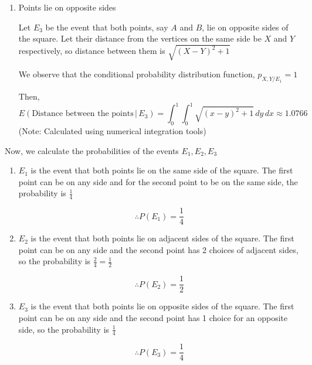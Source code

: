 \documentclass[12pt, oneside]{article}
\begin{document}
\begin{enumerate}
{\begin{enumerate}
        \item {
            Points lie on opposite sides

            Let \(E_3\) be the event that both points, say \(A\) and \(B\), lie on
            opposite sides of the square. Let their distance from the vertices on the
            same side be \(X\) and \(Y\) respectively, so distance between them is
            \(\sqrt{(X - Y)^2 + 1}\)

            We observe that the conditional probability distribution function,
            \(p_{X, Y / E_1} = 1\) 

            Then, \[
                E(\text{Distance between the points} \,|\, E_3) = \int_{0}^{1} \int_{0}^{1}
                   \sqrt{(x-y)^2 + 1} \,dy \,dx \approx 1.0766
            \]
            \hfill (Note: Calculated using numerical integration tools)
        }
    \end{enumerate}

    Now, we calculate the probabilities of the events \(E_1, E_2, E_3\)

    \begin{enumerate}
        \item {
            \(E_1\) is the event that both points lie on the same side of the square.
            The first point can be on any side and for the second point to be on
            the same side, the probability is \(\frac{1}{4}\)

            \[\therefore P(E_1) = \frac{1}{4}\]
        }
        \item {
            \(E_2\) is the event that both points lie on adjacent sides of the square.
            The first point can be on any side and the second point has 2 choices of
            adjacent sides, so the probability is \(\frac{2}{4} = \frac{1}{2}\)

            \[\therefore P(E_2) = \frac{1}{2}\]
        }
        \item {
            \(E_3\) is the event that both points lie on opposite sides of the square.
            The first point can be on any side and the second point has 1 choice for an
            opposite side, so the probability is \(\frac{1}{4}\)

            \[\therefore P(E_3) = \frac{1}{4}\]
        }
    \end{enumerate}

}
\end{enumerate}
\end{document}
